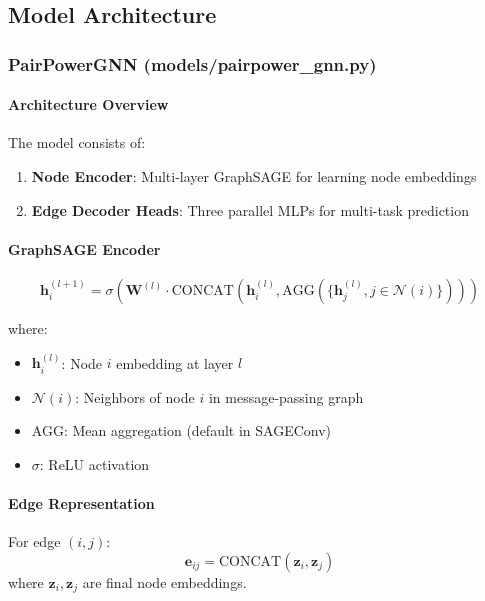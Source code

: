 \documentclass[12pt,a4paper]{article}
\begin{document}
\subsection{Model Architecture}

\subsubsection{PairPowerGNN (models/pairpower\_gnn.py)}

\paragraph{Architecture Overview}
The model consists of:
\begin{enumerate}
    \item \textbf{Node Encoder}: Multi-layer GraphSAGE for learning node embeddings
    \item \textbf{Edge Decoder Heads}: Three parallel MLPs for multi-task prediction
\end{enumerate}

\paragraph{GraphSAGE Encoder}
\begin{equation}
\mathbf{h}_i^{(l+1)} = \sigma\left(\mathbf{W}^{(l)} \cdot \text{CONCAT}\left(\mathbf{h}_i^{(l)}, \text{AGG}\left(\{\mathbf{h}_j^{(l)}, j \in \mathcal{N}(i)\}\right)\right)\right)
\end{equation}

where:
\begin{itemize}
    \item $\mathbf{h}_i^{(l)}$: Node $i$ embedding at layer $l$
    \item $\mathcal{N}(i)$: Neighbors of node $i$ in message-passing graph
    \item AGG: Mean aggregation (default in SAGEConv)
    \item $\sigma$: ReLU activation
\end{itemize}

\paragraph{Edge Representation}
For edge $(i,j)$:
\begin{equation}
\mathbf{e}_{ij} = \text{CONCAT}(\mathbf{z}_i, \mathbf{z}_j)
\end{equation}
where $\mathbf{z}_i, \mathbf{z}_j$ are final node embeddings.
\end{document}
